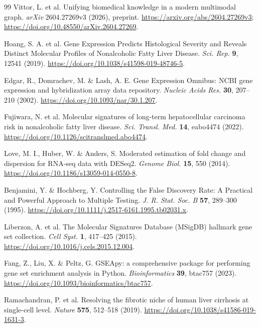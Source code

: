 \documentclass[11pt,a4paper]{article}
\begin{document}
\begin{thebibliography}{99}
 Vittor, L. et al. Unifying biomedical knowledge in a modern multimodal graph. \textit{arXiv} 2604.27269v3 (2026), preprint. \url{https://arxiv.org/abs/2604.27269v3}; \url{https://doi.org/10.48550/arXiv.2604.27269}.

 Hoang, S. A. et al. Gene Expression Predicts Histological Severity and Reveals Distinct Molecular Profiles of Nonalcoholic Fatty Liver Disease. \textit{Sci. Rep.} \textbf{9}, 12541 (2019). \url{https://doi.org/10.1038/s41598-019-48746-5}.

 Edgar, R., Domrachev, M. \& Lash, A. E. Gene Expression Omnibus: NCBI gene expression and hybridization array data repository. \textit{Nucleic Acids Res.} \textbf{30}, 207–210 (2002). \url{https://doi.org/10.1093/nar/30.1.207}.

 Fujiwara, N. et al. Molecular signatures of long-term hepatocellular carcinoma risk in nonalcoholic fatty liver disease. \textit{Sci. Transl. Med.} \textbf{14}, eabo4474 (2022). \url{https://doi.org/10.1126/scitranslmed.abo4474}.

 Love, M. I., Huber, W. \& Anders, S. Moderated estimation of fold change and dispersion for RNA-seq data with DESeq2. \textit{Genome Biol.} \textbf{15}, 550 (2014). \url{https://doi.org/10.1186/s13059-014-0550-8}.

 Benjamini, Y. \& Hochberg, Y. Controlling the False Discovery Rate: A Practical and Powerful Approach to Multiple Testing. \textit{J. R. Stat. Soc. B} \textbf{57}, 289–300 (1995). \url{https://doi.org/10.1111/j.2517-6161.1995.tb02031.x}.

 Liberzon, A. et al. The Molecular Signatures Database (MSigDB) hallmark gene set collection. \textit{Cell Syst.} \textbf{1}, 417–425 (2015). \url{https://doi.org/10.1016/j.cels.2015.12.004}.

 Fang, Z., Liu, X. \& Peltz, G. GSEApy: a comprehensive package for performing gene set enrichment analysis in Python. \textit{Bioinformatics} \textbf{39}, btac757 (2023). \url{https://doi.org/10.1093/bioinformatics/btac757}.

 Ramachandran, P. et al. Resolving the fibrotic niche of human liver cirrhosis at single-cell level. \textit{Nature} \textbf{575}, 512–518 (2019). \url{https://doi.org/10.1038/s41586-019-1631-3}.
\end{thebibliography}



\clearpage
\end{document}

